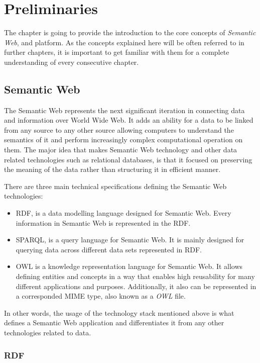 \chapter{Preliminaries}
\label{chap:num_1}

The chapter is going to provide the introduction to the core concepts of \textit{Semantic Web}, \solid{} and \lpa{} platform. As the concepts explained here will be often referred to in further chapters, it is important to get familiar with them for a complete understanding of every consecutive chapter. 

\section{Semantic Web}
\label{sssec:semantic_web_intro}

The Semantic Web represents the next significant iteration in connecting data and information over World Wide Web. It adds an ability for a data to be linked from any source to any other source allowing computers to understand the semantics of it and perform increasingly complex computational operation on them. The major idea that makes Semantic Web technology and other data related technologies such as relational databases, is that it focused on preserving the meaning of the data rather than structuring it in efficient manner. 

There are three main technical specifications defining the Semantic Web technologies:
\begin{itemize}
	\item \gls{RDF}, is a data modelling language designed for Semantic Web. Every information in Semantic Web is represented in the RDF.
	\item \gls{SPARQL}, is a query language for Semantic Web. It is mainly designed for querying data across different data sets represented in RDF.
    \item \gls{OWL} is a knowledge representation language for Semantic Web. It allows defining entities and concepts in a way that enables high reusability for many different applications and purposes. Additionally, it also can be represented in a corresponded \gls{MIME} type, also known as a \textit{OWL} file.
\end{itemize}  

In other words, the usage of the technology stack mentioned above is what defines a Semantic Web application and differentiates it from any other technologies related to data.

\subsection{RDF}

